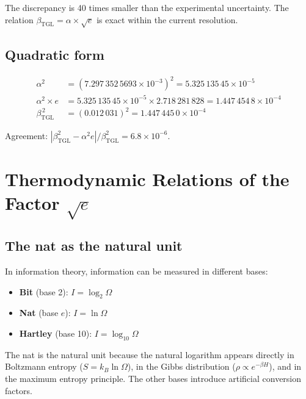 \documentclass[12pt,a4paper,twoside]{article}
\newcommand{\betatgl}{\beta_{\!\scriptscriptstyle\mathrm{TGL}}}
\begin{document}
The discrepancy is 40 times smaller than the experimental uncertainty. The relation $\betatgl = \alpha \times \sqrt{e}$ is exact within the current resolution.

\subsection{Quadratic form}

\begin{align}
\alpha^2 &= (7.297\,352\,5693 \times 10^{-3})^2 = 5.325\,135\,45 \times 10^{-5} \\
\alpha^2 \times e &= 5.325\,135\,45 \times 10^{-5} \times 2.718\,281\,828 = 1.447\,454\,8 \times 10^{-4} \\
\betatgl^{\,2} &= (0.012\,031)^2 = 1.447\,445\,0 \times 10^{-4}
\end{align}

Agreement: $|\betatgl^2 - \alpha^2 e|/\betatgl^2 = 6.8 \times 10^{-6}$.



\section{Thermodynamic Relations of the Factor $\sqrt{e}$}
\label{app:termodinamica}

\subsection{The nat as the natural unit}

In information theory, information can be measured in different bases:

\begin{itemize}[nosep]
\item \textbf{Bit} (base 2): $I = \log_2 \Omega$
\item \textbf{Nat} (base $e$): $I = \ln \Omega$
\item \textbf{Hartley} (base 10): $I = \log_{10} \Omega$
\end{itemize}

The nat is the natural unit because the natural logarithm appears directly in Boltzmann entropy ($S = k_B \ln \Omega$), in the Gibbs distribution ($\rho \propto e^{-\beta H}$), and in the maximum entropy principle. The other bases introduce artificial conversion factors.
\end{document}
